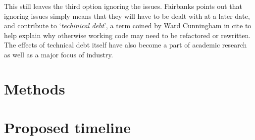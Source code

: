 \documentclass{article}
\begin{document}
This still leaves the third option \textendash{} ignoring the issues. Fairbanks points out that
ignoring issues simply means that they will have to be dealt with at a later date, and contribute to
`\textit{techinical debt}', a term coined by Ward Cunningham in cite to help explain why otherwise
working code may need to be refactored or rewritten. The effects of technical debt itself have also
become a part of academic research as well as a major focus of industry.

\section{Methods}
\section{Proposed timeline}
\end{document}
